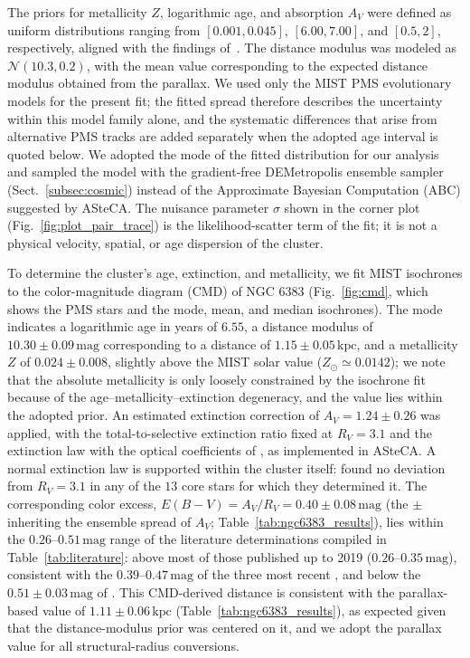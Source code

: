\documentclass{aa}
\begin{document}
The priors for metallicity $Z$, logarithmic age, and absorption $A_V$ were defined as uniform distributions ranging from $[0.001, 0.045]$, $[6.00, 7.00]$, and $[0.5, 2]$, respectively, aligned with the findings of~\citep{2024arXiv240301030P}. The distance modulus was modeled as $\mathcal{N}(10.3, 0.2)$, with the mean value corresponding to the expected distance modulus obtained from the parallax. We used only the \textsc{MIST} PMS evolutionary models for the present fit; the fitted spread therefore describes the uncertainty within this model family alone, and the systematic differences that arise from alternative PMS tracks are added separately when the adopted age interval is quoted below. We adopted the mode of the fitted distribution for our analysis and sampled the model with the gradient-free DEMetropolis ensemble sampler (Sect.~\ref{subsec:cosmic}) instead of the Approximate Bayesian Computation (ABC) suggested by ASteCA\@. The nuisance parameter $\sigma$ shown in the corner plot (Fig.~\ref{fig:plot_pair_trace}) is the likelihood-scatter term of the fit; it is not a physical velocity, spatial, or age dispersion of the cluster.

To determine the cluster's age, extinction, and metallicity, we fit MIST isochrones to the color-magnitude diagram (CMD) of NGC 6383 (Fig.~\ref{fig:cmd}, which shows the PMS stars and the mode, mean, and median isochrones). The mode indicates a logarithmic age in years of $6.55$, a distance modulus of $10.30\pm 0.09\,\mathrm{mag}$ corresponding to a distance of $1.15\pm0.05\,\mathrm{kpc}$, and a metallicity $Z $ of $0.024 \pm 0.008$, slightly above the MIST solar value ($Z_\odot\simeq0.0142$); we note that the absolute metallicity is only loosely constrained by the isochrone fit because of the age--metallicity--extinction degeneracy, and the value lies within the adopted prior. An estimated extinction correction of $A_V = 1.24 \pm 0.26$ was applied, with the total-to-selective extinction ratio fixed at $R_V = 3.1$ and the \citet{1989ApJ...345..245C} extinction law with the optical coefficients of \citet{1994ApJ...422..158O}, as implemented in ASteCA\@. A normal extinction law is supported within the cluster itself: \citet{2000AA...362..580V} found no deviation from $R_V = 3.1$ in any of the $13$ core stars for which they determined it. The corresponding color excess, $E(B-V) = A_V/R_V = 0.40 \pm 0.08\,\mathrm{mag}$ (the $\pm$ inheriting the ensemble spread of $A_V$; Table~\ref{tab:ngc6383_results}), lies within the $0.26$--$0.51\,\mathrm{mag}$ range of the literature determinations compiled in Table~\ref{tab:literature}: above most of those published up to 2019 ($0.26$--$0.35\,\mathrm{mag}$), consistent with the $0.39$--$0.47\,\mathrm{mag}$ of the three most recent \citep{2022ApJS..262....7H,2024arXiv240305143H,2024arXiv240301030P}, and below the $0.51 \pm 0.03\,\mathrm{mag}$ of \citet{2018AA...610A..30A}. This CMD-derived distance is consistent with the parallax-based value of $1.11 \pm 0.06\,\mathrm{kpc}$ (Table~\ref{tab:ngc6383_results}), as expected given that the distance-modulus prior was centered on it, and we adopt the parallax value for all structural-radius conversions.
\end{document}
